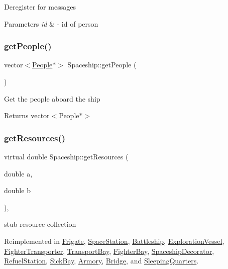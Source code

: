 Deregister for messages 
\begin{DoxyParams}{Parameters}
{\em id} & -\/ id of person \\
\hline
\end{DoxyParams}
\mbox{\label{classSpaceship_a23155ea96d499b31bde27e0c2f704ae6}} 
\subsubsection{\texorpdfstring{get\+People()}{getPeople()}}
{\footnotesize\ttfamily vector$<$\hyperlink{classPeople}{People}$\ast$$>$ Spaceship\+::get\+People (\begin{DoxyParamCaption}{ }\end{DoxyParamCaption})\hspace{0.3cm}{\ttfamily [inline]}}

Get the people aboard the ship \begin{DoxyReturn}{Returns}
vector$<$\+People$\ast$$>$ 
\end{DoxyReturn}
\mbox{\label{classSpaceship_ad2027533de1d789db5e3efa22055f2d0}} 
\subsubsection{\texorpdfstring{get\+Resources()}{getResources()}}
{\footnotesize\ttfamily virtual double Spaceship\+::get\+Resources (\begin{DoxyParamCaption}\item[{double}]{a,  }\item[{double}]{b }\end{DoxyParamCaption})\hspace{0.3cm}{\ttfamily [inline]}, {\ttfamily [virtual]}}

stub resource collection 

Reimplemented in \hyperlink{classFrigate_a333512076606313c57fc9957dccf9cb9}{Frigate}, \hyperlink{classSpaceStation_ae701844b2b5013cd51cc5ead813e7e51}{Space\+Station}, \hyperlink{classBattleship_a91c6d577c5c761b607b204a9fc59c3ad}{Battleship}, \hyperlink{classExplorationVessel_a3c3a641c6c249f80d68f20cf73f440f7}{Exploration\+Vessel}, \hyperlink{classFighterTransporter_ab2b29c07f0e5fd4fa5e35a37abefb26d}{Fighter\+Transporter}, \hyperlink{classTransportBay_afac369115f4c17522a123f36be183e29}{Transport\+Bay}, \hyperlink{classFighterBay_ae6071df768f59aeeab67f7b2bb1cce52}{Fighter\+Bay}, \hyperlink{classSpaceshipDecorator_a5ee7a9a8c146c85f08591e47d971dce7}{Spaceship\+Decorator}, \hyperlink{classRefuelStation_a69c7e7aca14ba70f4d2c4c11e43b4bb4}{Refuel\+Station}, \hyperlink{classSickBay_ab14fde02df1e95c352ba51d59480c3fa}{Sick\+Bay}, \hyperlink{classArmory_a06bba21799ef0b2a9f835632411420a4}{Armory}, \hyperlink{classBridge_a1508c1c9cfb44850fea31afcb7f1e403}{Bridge}, and \hyperlink{classSleepingQuarters_aa1c2a40c05a566955965dee8118dc410}{Sleeping\+Quarters}.

